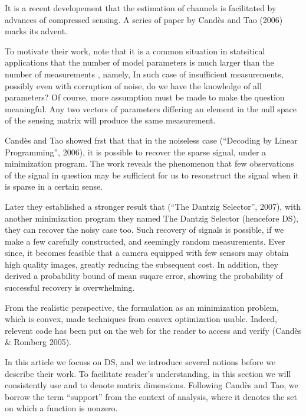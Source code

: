 \stopsection
\startsection [title={The Dantzig Selector}]

It is a recent developement that the estimation of channels is facilitated by advances of compressed sensing.
A series of paper by Cand\`es and Tao (2006) marks its advent.

To motivate their work, note that it is a common situation in statsitical applications that the number of model parameters  is much larger than the number of measurements , namely,
%
%
In such case of insufficient measurements, possibly even with corruption of noise, do we have the knowledge of all  parameters?
Of course, more assumption must be made to make the question meaningful.
Any two vectors of parameters differing an element in the null space of the sensing matrix will produce the same measurement.

Cand\`es and Tao showed frst that that in the noiseless case (``Decoding by Linear Programming'', 2006), it is possible to recover the sparse signal, under a  minimization program.
The work reveals the phenomenon that few observations of the signal in question may be sufficient for us to resonstruct the signal when it is sparse in a certain sense.

Later they established a stronger result that (``The Dantzig Selector'', 2007), with another  minimization program they named The Dantzig Selector (hencefore DS), they can recover the noisy case too.
Such recovery of signals is possible, if we make a few carefully constructed, and seemingly random measurements.
Ever since, it becomes feasible that a camera equipped with few sensors may obtain high quality images, greatly reducing the subsequent cost.
In addition, they derived a probability bound of mean suqare error, showing the probability of successful recovery is overwhelming.

From the realistic perspective, the formulation as an  minimization problem, which is convex, made techniques from convex optimization usable.
Indeed, relevent code has been put on the web for the reader to access and verify (Cand\`es \& Romberg 2005).

In this article we focuss on DS, and we introduce several notions before we describe their work.
To facilitate reader's understanding, in this section we will consistently use  and  to denote matrix dimensions.
Following Cand\`es and Tao, we borrow the term ``support'' from the context of analysis, where it denotes the set on which a function is nonzero.

